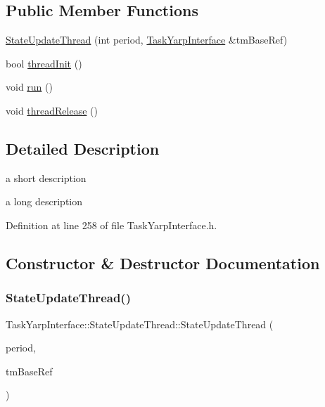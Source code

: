 \subsection*{Public Member Functions}
\begin{DoxyCompactItemize}
\item 
\hyperlink{classocra_1_1TaskYarpInterface_1_1StateUpdateThread_acd0edcec12037183ec9b7aab8dafbd99}{State\+Update\+Thread} (int period, \hyperlink{classocra_1_1TaskYarpInterface}{Task\+Yarp\+Interface} \&tm\+Base\+Ref)
\item 
bool \hyperlink{classocra_1_1TaskYarpInterface_1_1StateUpdateThread_afb9499707c2ea4b76bb108d74294b1fb}{thread\+Init} ()
\item 
void \hyperlink{classocra_1_1TaskYarpInterface_1_1StateUpdateThread_ae6be513380cf7cd48fac252379536479}{run} ()
\item 
void \hyperlink{classocra_1_1TaskYarpInterface_1_1StateUpdateThread_a77b5d075d27975a99cffad39664df76b}{thread\+Release} ()
\end{DoxyCompactItemize}


\subsection{Detailed Description}
a short description 

a long description 

Definition at line 258 of file Task\+Yarp\+Interface.\+h.



\subsection{Constructor \& Destructor Documentation}
\hypertarget{classocra_1_1TaskYarpInterface_1_1StateUpdateThread_acd0edcec12037183ec9b7aab8dafbd99}{}\label{classocra_1_1TaskYarpInterface_1_1StateUpdateThread_acd0edcec12037183ec9b7aab8dafbd99} 
\subsubsection{\texorpdfstring{State\+Update\+Thread()}{StateUpdateThread()}}
{\footnotesize\ttfamily Task\+Yarp\+Interface\+::\+State\+Update\+Thread\+::\+State\+Update\+Thread (\begin{DoxyParamCaption}\item[{int}]{period,  }\item[{\hyperlink{classocra_1_1TaskYarpInterface}{Task\+Yarp\+Interface} \&}]{tm\+Base\+Ref }\end{DoxyParamCaption})}



